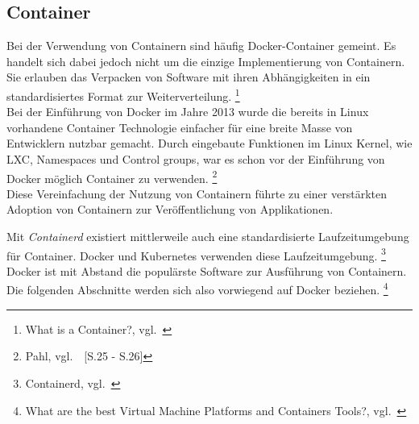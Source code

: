 \newpage
\subsection{Container}\label{container}

Bei der Verwendung von Containern sind häufig Docker-Container gemeint.
Es handelt sich dabei jedoch nicht um die einzige Implementierung von Containern.
Sie erlauben das Verpacken von Software mit ihren Abhängigkeiten in ein standardisiertes Format zur Weiterverteilung.
\footnote{What is a Container?, vgl.~\cite{DOCKER_WEBSITE}} \\

Bei der Einführung von Docker im Jahre 2013 wurde die bereits in Linux vorhandene Container Technologie einfacher für eine breite Masse von Entwicklern nutzbar gemacht.
Durch eingebaute Funktionen im Linux Kernel, wie LXC, Namespaces und Control groups, war es schon vor der Einführung von Docker möglich Container zu verwenden.
\footnote{Pahl, vgl.~\cite{Pahl2015}~[S.25 - S.26]} \\

Diese Vereinfachung der Nutzung von Containern führte zu einer verstärkten Adoption von Containern zur Veröffentlichung von Applikationen.

Mit \textsl{Containerd} existiert mittlerweile auch eine standardisierte Laufzeitumgebung für Container.
Docker und Kubernetes verwenden diese Laufzeitumgebung.
\footnote{Containerd, vgl.~\cite{CONTAINERD_WEBSITE}} \\

Docker ist mit Abstand die populärste Software zur Ausführung von Containern.
Die folgenden Abschnitte werden sich also vorwiegend auf Docker beziehen.
\footnote{What are the best Virtual Machine Platforms and Containers Tools?, vgl.~\cite{STACKSHARE_CONTAINERS_VMS}}


